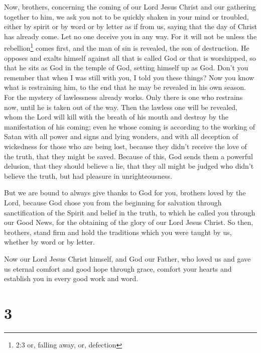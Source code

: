  Now, brothers, concerning the coming of our Lord Jesus
Christ and our gathering together to him, we ask you  not to
be quickly shaken in your mind or troubled, either by spirit or by word
or by letter as if from us, saying that the day of Christ has already
come.  Let no one deceive you in any way. For it will not be
unless the rebellion\footnote{2:3 or, falling away, or, defection} comes
first, and the man of sin is revealed, the son of destruction.
 He opposes and exalts himself against all that is called
God or that is worshipped, so that he sits as God in the temple of God,
setting himself up as God.  Don't you remember that when I
was still with you, I told you these things?  Now you know
what is restraining him, to the end that he may be revealed in his own
season.  For the mystery of lawlessness already works. Only
there is one who restrains now, until he is taken out of the way.
 Then the lawless one will be revealed, whom the Lord will
kill with the breath of his mouth and destroy by the manifestation of
his coming;  even he whose coming is according to the
working of Satan with all power and signs and lying wonders,
 and with all deception of wickedness for those who are
being lost, because they didn't receive the love of the truth, that they
might be saved.  Because of this, God sends them a powerful
delusion, that they should believe a lie,  that they all
might be judged who didn't believe the truth, but had pleasure in
unrighteousness.

 But we are bound to always give thanks to God for you,
brothers loved by the Lord, because God chose you from the beginning for
salvation through sanctification of the Spirit and belief in the truth,
 to which he called you through our Good News, for the
obtaining of the glory of our Lord Jesus Christ.  So then,
brothers, stand firm and hold the traditions which you were taught by
us, whether by word or by letter.

 Now our Lord Jesus Christ himself, and God our Father, who
loved us and gave us eternal comfort and good hope through grace,
 comfort your hearts and establish you in every good work
and word.

\hypertarget{section-2}{%
\section{3}\label{section-2}}

